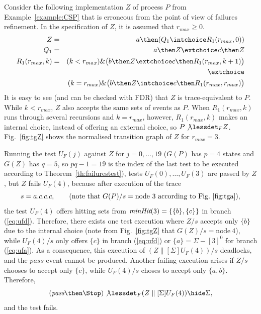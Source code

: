 \begin{example}
\label{ex:uf1tests} Consider the following implementation $Z$ of process $P$
from Example~\ref{example:CSP} that is erroneous from the point of view of
failures refinement. In the specification of $Z$, it is assumed that $r_{max}\ge 0$.
\begin{eqnarray*}
Z & = & a \then (Q_1 \intchoice R_1(r_{max},0))
\\
Q_1 & = & a\then Z \extchoice c\then Z
\\
R_1(r_{max},k) & = & (k < r_{max}) \& \big(b\then Z \extchoice  c\then R_1(r_{max},k+1)\big)
\\ & & \extchoice
\\ & & (k = r_{max}) \& \big(b\then Z \intchoice c\then R_1(r_{max},r_{max})\big)
\end{eqnarray*}
It is easy to see (and can be checked with FDR) that $Z$ is trace-equivalent
to $P$. While $k < r_{max}$, $Z$ also accepts the same sets of events as $P$.
When $R_1(r_{max},k)$ runs through several recursions and $k = r_{max}$,
however, $R_1(r_{max},k)$ makes an internal choice, instead of offering an
external choice, so $P\not\lessdet_F Z$. Fig.~\ref{fig:tgZ} shows the
normalised transition graph of $Z$ for $r_{max} = 3$.


Running the test $U_F(j)$ against $Z$ for $j=0,\dots,19$ ($G(P)$ has $p = 4$
states and $G(Z)$ has $q=5$, so $pq-1=19$ is the index of the last test to
be executed  according to Theorem~\ref{th:failurestest}), tests $U_F(0),\dots,
U_F(3)$ are passed by $Z$, but $Z$ fails $U_F(4)$, because after execution of
the trace
\[
s = a.c.c.c, \qquad\text{(note that $G(P)/s = \text{node}\ 3$ according to Fig.~\ref{fig:tga})},
\]
the test $U_F(4)$ offers hitting sets from $\text{\it minHit}(3) = \{\{b\},\{c\}\}$
in branch (\ref{eq:ufd}). Therefore,  there exists one test execution
where $Z/s$ accepts only $\{b\}$ due to the internal choice (note
from Fig.~\ref{fig:tgZ} that
$G(Z)/s = \text{node}\ 4$), while $U_F(4)/s$
only offers $\{c\}$ in branch (\ref{eq:ufd}) or $\{ a\} = \Sigma - [3]^0$ for
branch (\ref{eq:ufa}).  As a consequence, this execution of
$(Z\parallel[\Sigma] U_F(4))/s$ deadlocks, and the $pass$ event cannot be
produced. Another failing execution arises if $Z/s$ chooses to accept only
$\{c \}$, while $U_F(4)/s$ choses to accept only $\{a,b\}$. Therefore,
\[
(\epass\then \Stop)\not\lessdet_F  (Z\parallel[\Sigma] U_F(4)) \hide\Sigma,
\]
and the test fails. \xbox
\end{example}

